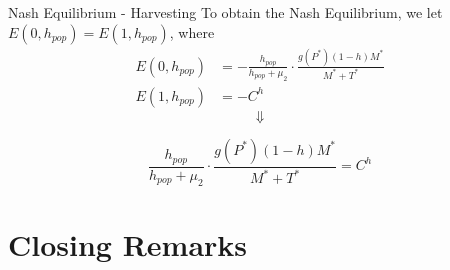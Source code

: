\documentclass{beamer}
\begin{document}
\begin{frame}{Nash Equilibrium - Harvesting}
    To obtain the Nash Equilibrium, we let $E(0, h_{pop}) = E(1, h_{pop})$, where \\
    \begin{align*}
        E(0, h_{pop}) &= -\frac{h_{pop}}{h_{pop} + \mu_{2}} \cdot \frac{g(P^{*})(1-h)M^{*}}{M^{*} + T^{*}} \\
        E(1, h_{pop}) &= -C^{h}
    \end{align*}
    $$\Downarrow$$
    
    
    
    
    
    $$\frac{h_{pop}}{h_{pop} + \mu_{2}} \cdot \frac{g(P^{*})(1-h)M^{*}}{M^{*} + T^{*}} = C^{h}$$
\end{frame}




\section{Closing Remarks}
\end{document}

